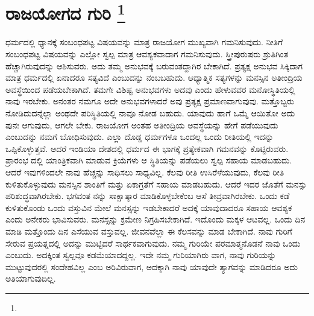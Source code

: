 
\chapter[ರಾಜಯೋಗದ ಗುರಿ ]{ರಾಜಯೋಗದ ಗುರಿ \protect\footnote{}}

ಧರ್ಮದಲ್ಲಿ ಧ್ಯಾನಕ್ಕೆ ಸಂಬಂಧಪಟ್ಟ ವಿಷಯವನ್ನು ಮಾತ್ರ ರಾಜಯೋಗ ಮುಖ್ಯವಾಗಿ ಗಮನಿಸುವುದು. ನೀತಿಗೆ ಸಂಬಂಧಪಟ್ಟ ವಿಷಯವನ್ನು ಎಲ್ಲೋ ಸ್ವಲ್ಪ ಮಾತ್ರ ಆವಶ್ಯಕವಾದಾಗ ಗಮನಿಸುವುದು. ಸ್ತ್ರೀಪುರುಷರು ಶ್ರುತಿಗಿಂತ ಹೆಚ್ಚಾಗಿರುವುದನ್ನು ಆಶಿಸುವರು. ಅದು ತಮ್ಮ ಅನುಭವಕ್ಕೆ ಬರುವಂತದ್ದಾಗಿರ ಬೇಕಾಗಿದೆ. ಪ್ರತ್ಯಕ್ಷ ಅನುಭವ ಸಿಕ್ಕಿದಾಗ ಮಾತ್ರ ಧರ್ಮದಲ್ಲಿ ಏನಾದರೂ ಸತ್ಯವಿದೆ ಎಂಬುದನ್ನು ನಂಬಬಹುದು. ಆಧ್ಯಾತ್ಮಿಕ ಸತ್ಯಗಳನ್ನು ಮನಸ್ಸಿನ ಅತೀಂದ್ರಿಯ ಅವಸ್ಥೆಯಿಂದ ಪಡೆಯಬೇಕಾಗಿದೆ. ತಮಗೇ ವಿಶಿಷ್ಟ ಅನುಭವಗಳು ಅದವು ಎಂದು ಹೇಳುವವರ ಮನೋಸ್ಥಿತಿಯಲ್ಲಿ ನಾವು ಇರಬೇಕು. ಅನಂತರ ನಮಗೂ ಅದೇ ಅನುಭವಗಳಾದರೆ ಅವು ಪ್ರತ್ಯಕ್ಷ ಪ್ರಮಾಣವಾಗುವುವು. ಮತ್ತೊಬ್ಬರು ನೋಡಿದುದನ್ನೆಲ್ಲಾ ಅಂಥದೇ ಪರಿಸ್ಥಿತಿಯಲ್ಲಿ ನಾವೂ ನೋಡ ಬಹುದು. ಯಾವುದು ಹಾಗೆ ಒಮ್ಮೆ ಆಯಿತೋ ಅದು ಪುನಃ ಆಗುವುದು, ಆಗಲೇ ಬೇಕು. ರಾಜಯೋಗ ಅಂತಹ ಅತೀಂದ್ರಿಯ ಅವಸ್ಥೆಯನ್ನು ಹೇಗೆ ಪಡೆಯುವುದು ಎಂಬುದನ್ನು ನಮಗೆ ಬೋಧಿಸುವುದು. ಎಲ್ಲಾ ದೊಡ್ಡ ಧರ್ಮಗಳೂ ಒಂದಲ್ಲ ಒಂದು ರೀತಿಯಲ್ಲಿ ಇದನ್ನು ಒಪ್ಪಿಕೊಳ್ಳುತ್ತವೆ. ಆದರೆ ಇಂಡಿಯಾ ದೇಶದಲ್ಲಿ ಧರ್ಮದ ಈ ಭಾಗಕ್ಕೆ ಪ್ರತ್ಯೇಕವಾಗಿ ಗಮನವನ್ನು ಕೊಟ್ಟಿರುವರು. ಪ್ರಾರಂಭ ದಲ್ಲಿ ಯಾಂತ್ರಿಕವಾಗಿ ಮಾಡುವ ಕ್ರಿಯೆಗಳು ಆ ಸ್ಥಿತಿಯನ್ನು ಪಡೆಯಲು ಸ್ವಲ್ಪ ಸಹಾಯ ಮಾಡಬಹುದು. ಆದರೆ ಇವುಗಳಿಂದಲೇ ನಾವು ಹೆಚ್ಚನ್ನು ಸಾಧಿಸಲು ಸಾಧ್ಯವಿಲ್ಲ. ಕೆಲವು ರೀತಿ ಉಸಿರೆಳೆಯುವುದು, ಕೆಲವು ರೀತಿ ಕುಳಿತುಕೊಳ್ಳುವುದು ಮನಸ್ಸಿನ ಶಾಂತಿಗೆ ಮತ್ತು ಏಕಾಗ್ರತೆಗೆ ಸಹಾಯ ಮಾಡಬಹುದು. ಆದರೆ ಇದರ ಜೊತೆಗೆ ಮನಸ್ಸು ಪರಿಶುದ್ಧವಾಗಿರಬೇಕು. ಭಗವಂತ ನನ್ನು ಸಾಕ್ಷಾತ್ಕಾರ ಮಾಡಿಕೊಳ್ಳಬೇಕೆಂಬ ಆಸೆ ತೀವ್ರವಾಗಿರಬೇಕು. ಒಂದು ಕಡೆ ಕುಳಿತುಕೊಂಡು ಒಂದು ವಸ್ತುವಿನ ಮೇಲೆ ಮನಸ್ಸನ್ನು ಇಡಬೇಕಾದರೆ ಅದಕ್ಕೆ ಯಾವುದಾದರೂ ಸಹಾಯ ಆವಶ್ಯಕ ಎಂದು ಅನೇಕರು ಭಾವಿಸುವರು. ಮನಸ್ಸನ್ನು ಕ್ರಮೇಣ ನಿಗ್ರಹಿಸಬೇಕಾಗಿದೆ. ಇದೊಂದು ಮಕ್ಕಳ ಆಟವಲ್ಲ. ಒಂದು ದಿನ ಮಾಡಿ ಮತ್ತೊಂದು ದಿನ ಎಸೆಯುವ ವಸ್ತುವಲ್ಲ. ಜೀವನವೆಲ್ಲಾ ಈ ಕೆಲಸವನ್ನು ಮಾಡ ಬೇಕಾಗಿದೆ. ನಾವು ಗುರಿಗೆ ಸೇರುವ ಪ್ರಯತ್ನದಲ್ಲಿ ಅದನ್ನು ಮುಟ್ಟಿದರೆ ಸಾರ್ಥಕವಾಗುವುದು. ನಮ್ಮ ಗುರಿಯೇ ಪರಮಾತ್ಮನೊಡನೆ ನಾವು ಒಂದು ಎಂಬುದು. ಅದಕ್ಕಿಂತ ಸ್ವಲ್ಪವೂ ಕಡಮೆಯಾದದ್ದಲ್ಲ. ಇದೇ ನಮ್ಮ ಗುರಿಯಾಗಿರು ವಾಗ, ನಾವು ಗುರಿಯನ್ನು ಮುಟ್ಟುವುದರಲ್ಲಿ ಸಂದೇಹವಿಲ್ಲ ಎಂಬ ಅರಿವಿರುವಾಗ, ಅದಕ್ಕಾಗಿ ನಾವು ಯಾವುದೇ ತ್ಯಾಗವನ್ನು ಮಾಡಿದರೂ ಅದು ಅತಿಯಾಗುವುದಿಲ್ಲ.

